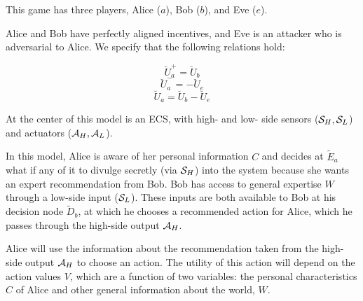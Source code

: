 \documentclass[../thesis.tex]{subfiles}
\begin{document}
\begin{center}
\end{center}

This game has three players, Alice ($a$), Bob ($b$),
and Eve ($e$).

Alice and Bob have perfectly aligned incentives,
and Eve is an attacker who is adversarial to
Alice.
We specify that the following relations hold:

$$\breve{U}^+_a = \breve{U}_b$$
$$\breve{U}^-_a = -\breve{U}_e$$
$$\breve{U}_a = \breve{U}_b - \breve{U}_e$$

At the center of this model is an ECS,
with high- and low- side sensors ($\mathcal{S}_H, \mathcal{S}_L$)
and actuators ($\mathcal{A}_H, \mathcal{A}_L$).

In this model, Alice is aware of her
personal information $C$ and decides at
$\tilde{E}_a$ what if any of it to divulge
secretly (via $\mathcal{S}_H$)
into the system because she wants an expert recommendation
from Bob.
Bob has access to general expertise $W$ through
a low-side input ($\mathcal{S}_L$).
These inputs are both available to Bob at his
decision node $\tilde{D}_b$, at which he chooses a
recommended action for Alice, which he passes through
the high-side output $\mathcal{A}_H$.

Alice will use the information about the recommendation
taken from the high-side output $\mathcal{A}_H$ to choose
an action.
The utility of this action will depend on the
action values $V$, which are a function of two
variables: the personal characteristics $C$ of Alice
and other general information about the world, $W$.
\end{document}
